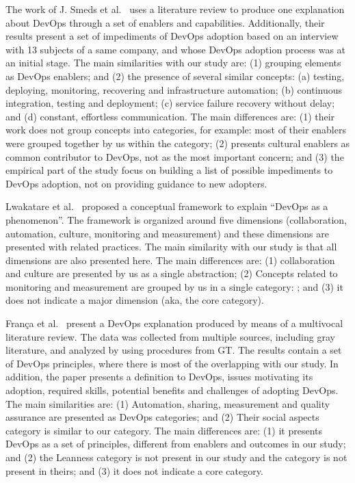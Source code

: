 The work of J. Smeds et al.~\cite{devops_a_definition_xp_15} uses a literature
review to produce one explanation about DevOps through a set of enablers and capabilities. Additionally, their results
present a set of impediments of DevOps adoption based on an interview with 13
subjects of a same company, and whose DevOps adoption process was at
an initial stage. The main similarities with our study are: (1) grouping
elements as DevOps enablers; and (2) the presence of several similar concepts:
(a) testing, deploying, monitoring, recovering and infrastructure automation;
(b) continuous integration, testing and deployment; (c) service failure recovery
without delay; and (d) constant, effortless communication. The main
differences are: (1) their work does not group concepts into categories,
for example: most of their enablers were grouped together by us within the  category; (2) presents cultural enablers as
common contributor to DevOps, not as the most important concern; and (3) the empirical
part of the study focus on building a list of possible impediments to DevOps
adoption, not on providing guidance to new adopters.

Lwakatare et al.~\cite{extending_dimensions_icsea_16} proposed a conceptual
framework to explain ``DevOps as a phenomenon''. The framework is organized around
five dimensions (collaboration, automation, culture, monitoring and measurement)
and these dimensions are presented with related practices. The main similarity
with our study is that all dimensions are also presented here. The
main differences are: (1) collaboration and culture are presented by us
as a single abstraction; (2) Concepts related to monitoring and measurement are
grouped by us in a single category: ; and (3) it does
not indicate a major dimension (aka, the core category).

Fran\c{c}a et al.~\cite{characterizing_devops_sbes_2016} present a DevOps
explanation produced by means of a multivocal literature review. The data was collected
from multiple sources, including gray literature, and analyzed by using procedures
from GT. The results contain a set of DevOps principles, where
there is most of the overlapping with our study. In addition, the paper
presents a definition to DevOps, issues motivating its adoption, required skills,
potential benefits and challenges of adopting DevOps. The main similarities
are: (1) Automation, sharing, measurement and quality assurance are presented as
DevOps categories; and (2) Their social aspects category is similar to our
\cc category. The main differences are: (1) it presents DevOps as a
set of principles, different from enablers and outcomes in our study; and (2) the Leanness
category is not present in our study and the  category is not present
in theirs; and (3) it does not indicate a core category.

